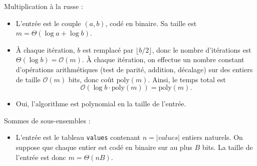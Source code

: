 \begin{exercice}
  \begin{questions}
  \item Multiplication à la russe :
  \end{questions}
  \begin{algorithm}[H]
  \end{algorithm}
  \begin{corrections}
    \begin{itemize}
    \item L'entrée est le couple $(a,b)$, codé en binaire. Sa taille est
      $m = \Theta(\log a + \log b)$.
    \item À chaque itération, $b$ est remplacé par $\lfloor b/2 \rfloor$, donc le nombre d'itérations est
      $\Theta(\log b)=\mathcal{O}(m)$.
      À chaque itération, on effectue un nombre constant d'opérations arithmétiques (test de parité, addition,
      décalage) sur des entiers de taille $\mathcal{O}(m)$ bits, donc coût $\mathrm{poly}(m)$.
      Ainsi, le temps total est
      \[
      \mathcal{O}(\log b \cdot \mathrm{poly}(m)) = \mathrm{poly}(m).
      \]
    \item Oui, l'algorithme est polynomial en la taille de l'entrée.
    \end{itemize}
  \end{corrections}

  \begin{questions}
  \item Sommes de sous-ensembles :
  \end{questions}
  \begin{algorithm}[H]
  \end{algorithm}
  \begin{corrections}
    \begin{itemize}
    \item L'entrée est le tableau \texttt{values} contenant $n = |\mathit{values}|$ entiers naturels.
      On suppose que chaque entier est codé en binaire sur au plus $B$ bits.
      La taille de l'entrée est donc $m = \Theta(nB)$.


\end{itemize}
\end{corrections}
\end{exercice}
